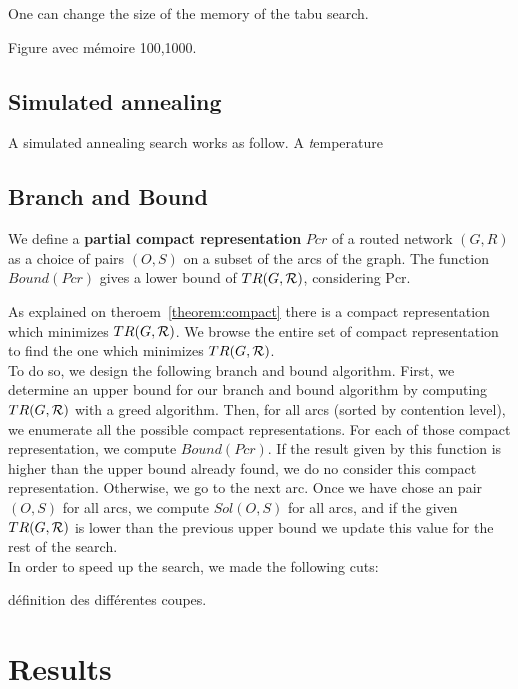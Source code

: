 \documentclass[english]{article}
\begin{document}
One can change the size of the memory of the tabu search. 

Figure avec mémoire 100,1000.

\subsection{Simulated annealing}

A simulated annealing search works as follow. A {\emph temperature}

\subsection{Branch and Bound}
We define a \textbf{partial compact representation} $Pcr$ of a routed network $(G,R)$ as a choice of pairs $(O,S)$ on a subset of the arcs of the graph.
The function $Bound(Pcr)$ gives a lower bound of $TR(G,{\cal R})$, considering Pcr.


 As explained on theroem~\ref{theorem:compact} there is a compact representation which minimizes $TR(G,{\cal R})$. We browse the entire set of compact representation to find the one which minimizes $TR(G,{\cal R})$.\\
 To do so, we design the following branch and bound algorithm. First, we determine an upper bound for our branch and bound algorithm by computing $TR(G,{\cal R})$ with a greed algorithm. Then, for all arcs (sorted by contention level), we enumerate all the possible compact representations. For each of those compact representation, we compute $Bound(Pcr)$. If the result given by this function is higher than the upper bound already found, we do no consider this compact representation. Otherwise, we go to the next arc. Once we have chose an pair $(O,S)$ for all arcs, we compute $Sol(O,S)$ for all arcs, and if the given $TR(G,{\cal R})$ is lower than the previous upper bound we update this value for the rest of the search.\\


In order to speed up the search, we made the following cuts:

définition des différentes coupes.\\

\section{Results}
\end{document}
